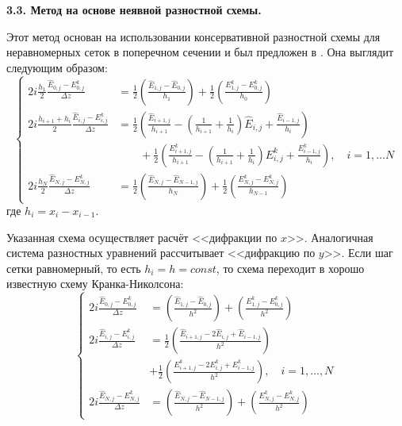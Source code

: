 \vspace{1em}
\textbf{3.3. Метод на основе неявной разностной схемы.}
\vspace{0.5em}

Этот метод основан на использовании консервативной разностной схемы для неравномерных сеток в поперечном сечении и был предложен в \cite{SweepScheme}.
Она выглядит следующим образом:
\begin{equation}\label{Sweep_Diff_Sys_General_Conservative}
    \left\{
    \begin{aligned}
        2i\frac{h_1}{2}\frac{\hat{E}_{0,j}-E^k_{0,j}}{\Delta z} & = \frac{1}{2}\left(\frac{\hat{E}_{1,j}-\hat{E}_{0,j}}{h_1}\right) + \frac{1}{2}\left(\frac{E^k_{1,j}-E^k_{0,j}}{h_0}\right)\\
        2i\frac{h_{i+1}+h_i}{2}\frac{\hat{E}_{i,j}-E^k_{i,j}}{\Delta z} & = \frac{1}{2}\left(\frac{\hat{E}_{i+1,j}}{h_{i+1}} -\left(\frac{1}{h_{i+1}} + \frac{1}{h_i}\right)\hat{E}_{i,j} + \frac{\hat{E}_{i-1,j}}{h_i}\right) \\
        & \qquad+ \frac{1}{2}\left(\frac{E^k_{i+1,j}}{h_{i+1}} -\left(\frac{1}{h_{i+1}} + \frac{1}{h_i}\right)E^k_{i,j} + \frac{E^k_{i-1,j}}{h_i}\right),\quad i=1,\ldots N\\
        2i\frac{h_N}{2}\frac{\hat{E}_{N,j}-E^k_{N,j}}{\Delta z} & = \frac{1}{2}\left(\frac{\hat{E}_{N,j}-\hat{E}_{N-1,j}}{h_N}\right) + \frac{1}{2}\left(\frac{E^k_{N,j}-E^k_{N,j}}{h_{N-1}}\right)
    \end{aligned}
    \right.
\end{equation}
где  $h_i=x_i-x_{i-1}$.

Указанная схема осуществляет расчёт <<дифракции по $x$>>. Аналогичная система разностных уравнений рассчитывает <<дифракцию по $y$>>.
Если шаг сетки равномерный, то есть $h_i=h=const$, то схема переходит в хорошо известную схему Кранка-Николсона:
\begin{equation}\label{Sweep_Diff_Sys_Crank_Nicholson}
    \left\{
    \begin{aligned}
        2i\frac{\hat{E}_{0,j}-E^k_{0,j}}{\Delta z} & = \left(\frac{\hat{E}_{1,j}-\hat{E}_{0,j}}{h^2}\right) + \left(\frac{E^k_{1,j}-E^k_{0,j}}{h^2}\right)\\
        2i\frac{\hat{E}_{i,j}-E^k_{i,j}}{\Delta z} & = \frac{1}{2}\left(\frac{\hat{E}_{i+1,j} - 2\hat{E}_{i,j} + \hat{E}_{i-1,j}}{h^2}\right) \\
                                                    & + \frac{1}{2}\left(\frac{E^k_{i+1,j} - 2E^k_{i,j} + E^k_{i-1,j}}{h^2}\right), \quad i = 1, \ldots, N\\
        2i\frac{\hat{E}_{N,j}-E^k_{N,j}}{\Delta z} & = \left(\frac{\hat{E}_{N,j}-\hat{E}_{N-1,j}}{h^2}\right) + \left(\frac{E^k_{N,j}-E^k_{N,j}}{h^2}\right)
    \end{aligned}
    \right.
\end{equation}

